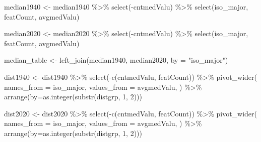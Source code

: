 \documentclass[
]{article}
\newenvironment{Shaded}{\begin{snugshade}}{\end{snugshade}}
\newcommand{\AttributeTok}[1]{\textcolor[rgb]{0.77,0.63,0.00}{#1}}
\newcommand{\DecValTok}[1]{\textcolor[rgb]{0.00,0.00,0.81}{#1}}
\newcommand{\FunctionTok}[1]{\textcolor[rgb]{0.00,0.00,0.00}{#1}}
\newcommand{\NormalTok}[1]{#1}
\newcommand{\OtherTok}[1]{\textcolor[rgb]{0.56,0.35,0.01}{#1}}
\newcommand{\SpecialCharTok}[1]{\textcolor[rgb]{0.00,0.00,0.00}{#1}}
\newcommand{\StringTok}[1]{\textcolor[rgb]{0.31,0.60,0.02}{#1}}
\begin{document}
\begin{Shaded}
\begin{Highlighting}[]
\NormalTok{median1940 }\OtherTok{\textless{}{-}}\NormalTok{ median1940 }\SpecialCharTok{\%\textgreater{}\%}
  \FunctionTok{select}\NormalTok{(}\SpecialCharTok{{-}}\NormalTok{cntmedValu) }\SpecialCharTok{\%\textgreater{}\%}
  \FunctionTok{select}\NormalTok{(iso\_major, featCount, avgmedValu)}

\NormalTok{median2020 }\OtherTok{\textless{}{-}}\NormalTok{ median2020 }\SpecialCharTok{\%\textgreater{}\%}
  \FunctionTok{select}\NormalTok{(}\SpecialCharTok{{-}}\NormalTok{cntmedValu) }\SpecialCharTok{\%\textgreater{}\%}
  \FunctionTok{select}\NormalTok{(iso\_major, featCount, avgmedValu)}

\NormalTok{median\_table }\OtherTok{\textless{}{-}} \FunctionTok{left\_join}\NormalTok{(median1940, median2020, }\AttributeTok{by =} \StringTok{"iso\_major"}\NormalTok{)}

\NormalTok{dist1940 }\OtherTok{\textless{}{-}}\NormalTok{ dist1940 }\SpecialCharTok{\%\textgreater{}\%}
  \FunctionTok{select}\NormalTok{(}\SpecialCharTok{{-}}\FunctionTok{c}\NormalTok{(cntmedValu, featCount)) }\SpecialCharTok{\%\textgreater{}\%}
  \FunctionTok{pivot\_wider}\NormalTok{(}
    \AttributeTok{names\_from =}\NormalTok{ iso\_major, }
    \AttributeTok{values\_from =}\NormalTok{ avgmedValu,}
\NormalTok{  ) }\SpecialCharTok{\%\textgreater{}\%}
  \FunctionTok{arrange}\NormalTok{(}\AttributeTok{by=}\FunctionTok{as.integer}\NormalTok{(}\FunctionTok{substr}\NormalTok{(distgrp, }\DecValTok{1}\NormalTok{, }\DecValTok{2}\NormalTok{)))}

\NormalTok{dist2020 }\OtherTok{\textless{}{-}}\NormalTok{ dist2020 }\SpecialCharTok{\%\textgreater{}\%}
  \FunctionTok{select}\NormalTok{(}\SpecialCharTok{{-}}\FunctionTok{c}\NormalTok{(cntmedValu, featCount)) }\SpecialCharTok{\%\textgreater{}\%}
  \FunctionTok{pivot\_wider}\NormalTok{(}
    \AttributeTok{names\_from =}\NormalTok{ iso\_major, }
    \AttributeTok{values\_from =}\NormalTok{ avgmedValu,}
\NormalTok{  ) }\SpecialCharTok{\%\textgreater{}\%}
  \FunctionTok{arrange}\NormalTok{(}\AttributeTok{by=}\FunctionTok{as.integer}\NormalTok{(}\FunctionTok{substr}\NormalTok{(distgrp, }\DecValTok{1}\NormalTok{, }\DecValTok{2}\NormalTok{)))}
\end{Highlighting}
\end{Shaded}
\end{document}

